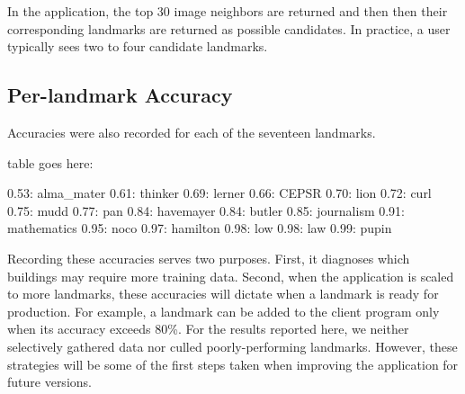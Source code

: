 In the application, the top 30 image neighbors are returned and then then their corresponding landmarks are returned as possible candidates. In practice, a user typically sees two to four candidate landmarks.

\subsection{Per-landmark Accuracy}

Accuracies were also recorded for each of the seventeen landmarks.

table goes here:

0.53: alma_mater
0.61: thinker
0.69: lerner
0.66: CEPSR
0.70: lion
0.72: curl
0.75: mudd
0.77: pan
0.84: havemayer
0.84: butler
0.85: journalism
0.91: mathematics
0.95: noco
0.97: hamilton
0.98: low
0.98: law
0.99: pupin

Recording these accuracies serves two purposes. First, it diagnoses which buildings may require more training data. Second, when the application is scaled to more landmarks, these accuracies will dictate when a landmark is ready for production. For example, a landmark can be added to the client program only when its accuracy exceeds 80\%. For the results reported here, we neither selectively gathered data nor culled poorly-performing landmarks. However, these strategies will be some of the first steps taken when improving the application for future versions.  
